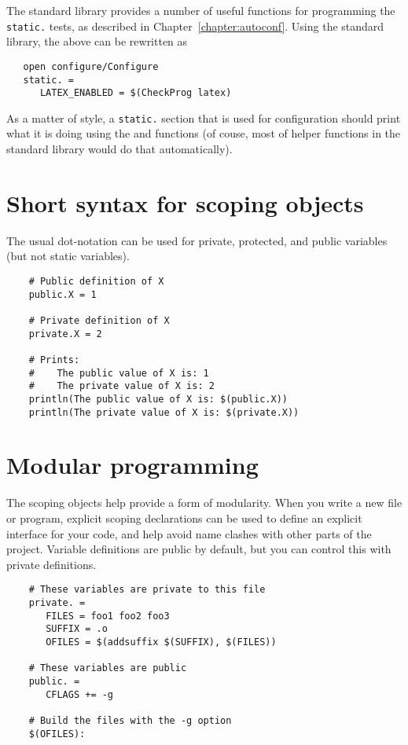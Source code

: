 The \OMake standard library provides a number of useful functions for
programming the \verb+static.+ tests, as described in
Chapter~\ref{chapter:autoconf}. Using the standard library, the above can
be rewritten as

\begin{verbatim}
   open configure/Configure
   static. =
      LATEX_ENABLED = $(CheckProg latex)
\end{verbatim}

As a matter of style, a \verb+static.+ section that is used for configuration should print what it
is doing using the  and
 functions (of couse, most of helper functions in
the standard library would do that automatically).

\section{Short syntax for scoping objects}

The usual dot-notation can be used for private, protected, and public variables (but not
static variables).

\begin{verbatim}
    # Public definition of X
    public.X = 1

    # Private definition of X
    private.X = 2

    # Prints:
    #    The public value of X is: 1
    #    The private value of X is: 2
    println(The public value of X is: $(public.X))
    println(The private value of X is: $(private.X))
\end{verbatim}

\section{Modular programming}

The scoping objects help provide a form of modularity.  When you write a new file or program,
explicit scoping declarations can be used to define an explicit interface for your code, and help
avoid name clashes with other parts of the project.  Variable definitions are public by default, but
you can control this with private definitions.

\begin{verbatim}
    # These variables are private to this file
    private. =
       FILES = foo1 foo2 foo3
       SUFFIX = .o
       OFILES = $(addsuffix $(SUFFIX), $(FILES))

    # These variables are public
    public. =
       CFLAGS += -g

    # Build the files with the -g option
    $(OFILES):
\end{verbatim}

